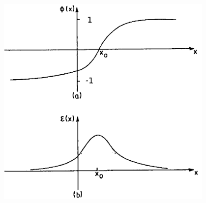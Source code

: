 \documentclass[handout]{beamer}
\begin{document}
\begin{frame}
\begin{columns}[T]
\begin{column}[T]{.6\linewidth}
 \end{column}
 \begin{column}[T]{.4\linewidth}
\begin{figure}
\includegraphics[scale=0.27]{tab.png}
\end{figure}
 \end{column}
\end{columns}
  \end{frame}
  
\end{document}
